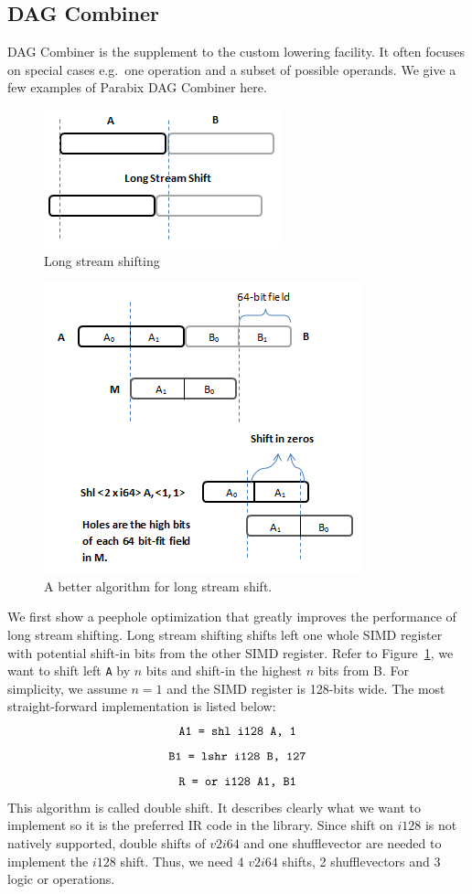 \subsection{DAG Combiner}
\label{sec:long_shift}
DAG Combiner is the supplement to the custom lowering facility. It often focuses on special cases e.g.\ one operation and a subset of possible operands. We give a few examples of Parabix DAG Combiner here.

\begin{figure}[htbp!]
\centering
\includegraphics[scale=0.8]{draw/long_shift.png}
\caption{Long stream shifting}
\label{fig:long_shift}
\end{figure}

\begin{figure}[htbp!]
\centering
\includegraphics[scale=0.9]{draw/long_shift_good.png}
\caption{A better algorithm for long stream shift.}
\label{fig:long_shift_good}
\end{figure}

We first show a peephole optimization that greatly improves the performance of long stream shifting. Long stream shifting shifts left one whole SIMD register with potential shift-in bits from the other SIMD register. Refer to Figure~\ref{fig:long_shift}, we want to shift left {\tt A} by $n$ bits and shift-in the highest $n$ bits from B. For simplicity, we assume $n = 1$ and the SIMD register is 128-bits wide. The most straight-forward implementation is listed below:
  \[ \text{\tt A1 = shl i128 A, 1} \]
  \[ \text{\tt B1 = lshr i128 B, 127} \]
  \[ \text{\tt R = or i128 A1, B1} \]
This algorithm is called double shift. It describes clearly what we want to implement so it is the preferred IR code in the library. Since shift on $i128$ is not natively supported, double shifts of $v2i64$ and one shufflevector are needed to implement the $i128$ shift. Thus, we need 4 $v2i64$ shifts, 2 shufflevectors and 3 logic or operations.

